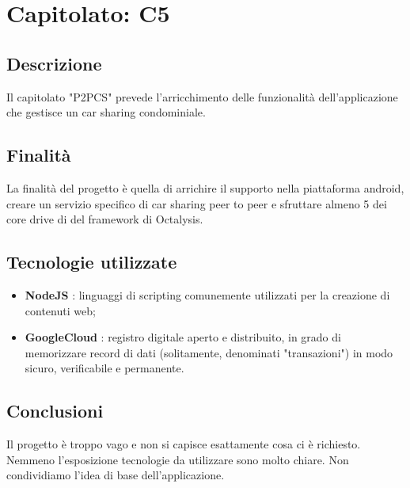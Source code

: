 \section{Capitolato: C5}
	\subsection{Descrizione}
		Il capitolato "P2PCS" prevede l'arricchimento delle funzionalità dell'applicazione che gestisce un car sharing condominiale.
	\subsection{Finalità}
		La finalità del progetto è quella di arrichire il supporto nella piattaforma android, creare un servizio specifico di car sharing peer to peer e sfruttare almeno 5 dei core drive di del framework di Octalysis.
	\subsection{Tecnologie utilizzate}
		\begin{itemize}
			\item \textbf{NodeJS} : linguaggi di scripting comunemente utilizzati per la creazione di contenuti web;
			\item \textbf{GoogleCloud} : registro digitale aperto e distribuito, in grado di memorizzare record di dati (solitamente, denominati "transazioni") in modo sicuro, verificabile e permanente.
		\end{itemize}
	\subsection{Conclusioni}
		Il progetto è troppo vago e non si capisce esattamente cosa ci è richiesto. Nemmeno l'esposizione tecnologie da utilizzare sono molto chiare.
		Non condividiamo l'idea di base dell'applicazione. 
